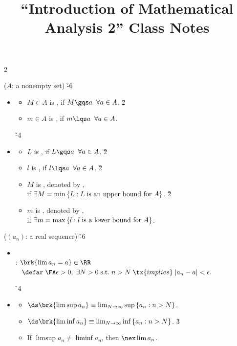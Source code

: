 \documentclass[dvipdfmx,a4paper,titlepage,9pt]{jsarticle}
\title{``Introduction of Mathematical Analysis 2'' Class Notes}
\begin{document}
\begin{multicols*}{2}

 {\color{Gray}($A$: a nonempty set)} \v{-6}
\begin{itemize}[label={-}]
\item{} 
\begin{itemize}[label={$\cdot$}]
\setlength{\leftskip}{-10pt}
\item $M\in A$ is , if $M\gqs a\;\;\forall a\in A$. \v2
\item $m\in A$ is , if $m\lqs a\;\;\forall a\in A$.
\end{itemize}

\; \v{-4}

\item{}
\begin{itemize}[label={$\cdot$}]
\setlength{\leftskip}{-10pt}
\item $L$ is , if $L\gqs a\;\;\forall a\in A$. \v2
\item $l$ is , if $l\lqs a\;\;\forall a\in A$. \v2
\item $M$ is , denoted by , \\
               if $\exists M=\min{}\{L:L\text{\;is an upper bound for $A$}\}$. \v2
\item $m$ is , denoted by , \\
               if $\exists m=\max{}\{l:l\text{\;is a lower bound for $A$}\}$.
\end{itemize}
\end{itemize}

\;

 {\color{Gray}($(a_n)$: a real sequence)} \v{-6}
\begin{itemize}[label={-}]
\item{} \\
: $\brk{\lim a_n=a}\in\RR$ \\
$\;\;\;\defar\;\FA\epsilon>0,\;\exists N>0\;\text{s.t.}\;n>N\;\tx{implies}\;|a_n-a|<\epsilon.$

\; \v{-4}

\item{}
\begin{itemize}[label={$\cdot$}]
\setlength{\leftskip}{-10pt}
\item $\ds\brk{\limsup a_n}\equiv\lim_{N\to\infty}\sup{}\{a_n:n>N\}$.
\item $\ds\brk{\liminf a_n}\equiv\lim_{N\to\infty}\inf{}\{a_n:n>N\}$. \v3
\item If $\limsup a_n\neq\liminf a_n$, then $\nex\lim a_n$.
\end{itemize}


\end{itemize}
\end{multicols*}
\end{document}
